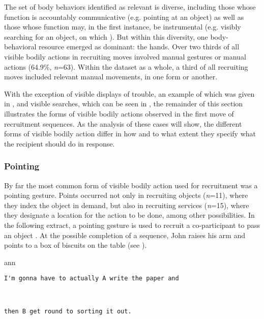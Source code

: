 \documentclass[output=paper,nonflat,modfont,draft]{langsci/langscibook}
\begin{document}
The set of body behaviors identified as relevant is diverse, including those whose function is accountably communicative (e.g. pointing at an object) as well as those whose function may, in the first instance, be instrumental (e.g. visibly searching for an object, on which \citealt [see] [] {DrewKendrick2017}). But within this diversity, one body-behavioral resource emerged as dominant: the hands. Over two thirds of all visible bodily actions in recruiting moves involved manual gestures or manual actions (64.9\%, \textit{n}=63). Within the dataset as a whole, a third of all recruiting moves included relevant manual movements, in one form or another.

With the exception of visible displays of trouble, an example of which was given in , and visible searches, which can be seen in , the remainder of this section illustrates the forms of visible bodily actions observed in the first move of recruitment sequences. As the analysis of these cases will show, the different forms of visible bodily action differ in how and to what extent they specify what the recipient should do in response.

\subsubsection{Pointing}
By far the most common form of visible bodily action used for recruitment was a pointing gesture. Points occurred not only in recruiting objects (\textit{n}=11), where they index the object in demand, but also in recruiting services (\textit{n}=15), where they designate a location for the action to be done, among other possibilities. In the following extract, a pointing gesture is used to recruit a co-participant to pass an object \citep[see also][22--23]{DrewCouper-Kuhlen2014a}. At the possible completion of a sequence, John raises his arm and points to a box of biscuits on the table (see ).

\newpage
{}

\begin{transbox}{1}{ann}
\begin{verbatim}
I'm gonna have to actually A write the paper and
\end{verbatim}
\end{transbox}

\begin{transbox}{2}{~}
\begin{verbatim}
then B get round to sorting it out.
\end{verbatim}
\end{transbox}
\end{document}
